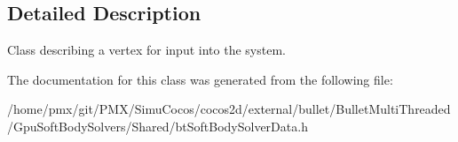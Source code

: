 \subsection{Detailed Description}
Class describing a vertex for input into the system. 

The documentation for this class was generated from the following file\+:\begin{DoxyCompactItemize}
\item 
/home/pmx/git/\+P\+M\+X/\+Simu\+Cocos/cocos2d/external/bullet/\+Bullet\+Multi\+Threaded/\+Gpu\+Soft\+Body\+Solvers/\+Shared/bt\+Soft\+Body\+Solver\+Data.\+h\end{DoxyCompactItemize}

